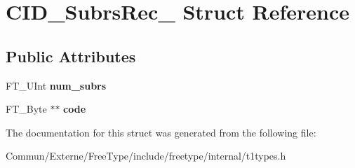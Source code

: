 \hypertarget{struct_c_i_d___subrs_rec__}{}\section{C\+I\+D\+\_\+\+Subrs\+Rec\+\_\+ Struct Reference}
\label{struct_c_i_d___subrs_rec__}
\subsection*{Public Attributes}
\begin{DoxyCompactItemize}
\item 
F\+T\+\_\+\+U\+Int {\bfseries num\+\_\+subrs}\hypertarget{struct_c_i_d___subrs_rec___a3abd23388e2e0f4888f826a993953c7e}{}\label{struct_c_i_d___subrs_rec___a3abd23388e2e0f4888f826a993953c7e}

\item 
F\+T\+\_\+\+Byte $\ast$$\ast$ {\bfseries code}\hypertarget{struct_c_i_d___subrs_rec___a1a4f0a4e514492fccaf81d7ede6c4e08}{}\label{struct_c_i_d___subrs_rec___a1a4f0a4e514492fccaf81d7ede6c4e08}

\end{DoxyCompactItemize}


The documentation for this struct was generated from the following file\+:\begin{DoxyCompactItemize}
\item 
Commun/\+Externe/\+Free\+Type/include/freetype/internal/t1types.\+h\end{DoxyCompactItemize}

